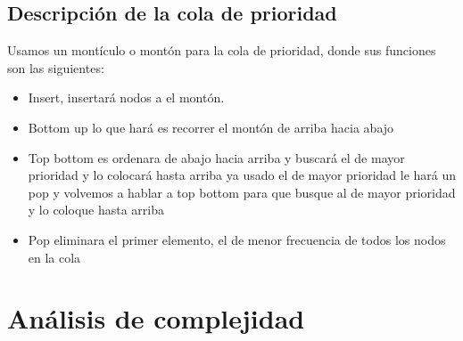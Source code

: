 \documentclass[12 pt]{report}
\begin{document}
\subsection{Descripción de la cola de prioridad}
Usamos un montículo o montón para la cola de prioridad, donde sus funciones son las siguientes:\\
\begin{itemize}
\item Insert, insertará nodos a el montón.
\item Bottom up lo que hará es recorrer el montón de arriba hacia abajo
\item Top bottom es ordenara de abajo hacia arriba y buscará el de mayor prioridad y lo colocará hasta arriba ya usado el de mayor prioridad le hará un pop y volvemos a hablar a top bottom para que busque al de mayor prioridad y lo coloque hasta arriba
\item Pop eliminara el primer elemento, el de menor frecuencia de todos los nodos en la cola
\end{itemize}
\newpage

\section{Análisis de complejidad}
\end{document}
